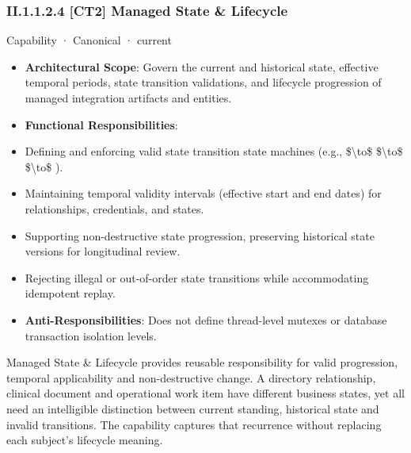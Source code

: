 \subsubsection*{II.1.1.2.4 [CT2] Managed State \& Lifecycle}
\label{navigation:II.1.1.2.4}

\label{element:6296abeee5074b9e80f21aea3a297e42}
{\small Capability · Canonical · current}\par

\begin{itemize}


\item \textbf{Architectural Scope}: Govern the current and historical state, effective temporal periods, state transition validations, and lifecycle progression of managed integration artifacts and entities.

\item \textbf{Functional Responsibilities}:

\item Defining and enforcing valid state transition state machines (e.g., \texttt{} \$\textbackslash{}to\$ \texttt{} \$\textbackslash{}to\$ \texttt{} \$\textbackslash{}to\$ \texttt{}).

\item Maintaining temporal validity intervals (effective start and end dates) for relationships, credentials, and states.

\item Supporting non-destructive state progression, preserving historical state versions for longitudinal review.

\item Rejecting illegal or out-of-order state transitions while accommodating idempotent replay.

\item \textbf{Anti-Responsibilities}: Does not define thread-level mutexes or database transaction isolation levels.

\end{itemize}


Managed State \& Lifecycle provides reusable responsibility for valid progression, temporal applicability and non-destructive change. A directory relationship, clinical document and operational work item have different business states, yet all need an intelligible distinction between current standing, historical state and invalid transitions. The capability captures that recurrence without replacing each subject's lifecycle meaning.



